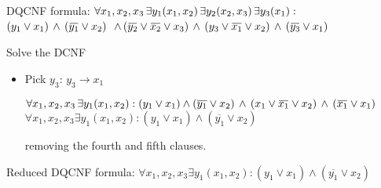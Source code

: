 \documentclass[xcolor=table	]{beamer}
\newcommand{\ov}[1]{\mkern 1.5mu\overline{\mkern-1.5mu#1\mkern-1.5mu}\mkern 1.5mu}
\begin{document}
\begin{frame}{}
\begin{alertblock}{DQCNF formula:}
	{
		$\forall x_1,x_2,x_3 \, \exists y_1(x_1,x_2) \, \exists y_2(x_2,x_3) \, \exists y_3(x_1) : \newline$
		$(y_{1} \vee x_1) \, \wedge \, (\ov{y_1} \vee x_2)  \newline$ 
		$ \, \wedge \, (\ov{y_2} \vee \ov{x_2} \vee x_3)  \newline \, \wedge \, (y_3 \vee \ov{x_1} \vee x_2) \, \wedge \, (\ov{y_3} \vee x_1)$
		\vspace{0.2cm}
	}
\end{alertblock}
\begin{exampleblock}{Solve the DCNF}
	{ \begin{itemize}
		\item Pick $y_3$: $y_3 \rightarrow x_1$  \\
			\pause
			
			\pause 
			$\forall x_1,x_2,x_3 \, \exists y_1(x_1,x_2)  : (y_1 \vee x_1) \wedge (\overline{y_1} \vee x_2)
			\, \wedge \, (x_1 \vee \ov{x_1} \vee x_2) \, \wedge \, (\ov{x_1} \vee x_1) \newline$ \\ 
			\pause 
			$\forall x_1,x_2,x_3 \exists y_1(x_1,x_2) : (y_1 \vee x_1) \wedge (\overline{y_1} \vee x_2)$
			
			removing the fourth and fifth clauses.	
		\end{itemize}
	}
\end{exampleblock}
\pause
\begin{alertblock}{Reduced DQCNF formula:}
	{
			$\forall x_1,x_2,x_3 \exists y_1(x_1,x_2) : (y_1 \vee x_1) \wedge (\overline{y_1} \vee x_2)$
	}
\end{alertblock}

\end{frame}


%
%
%
%
\end{document}
